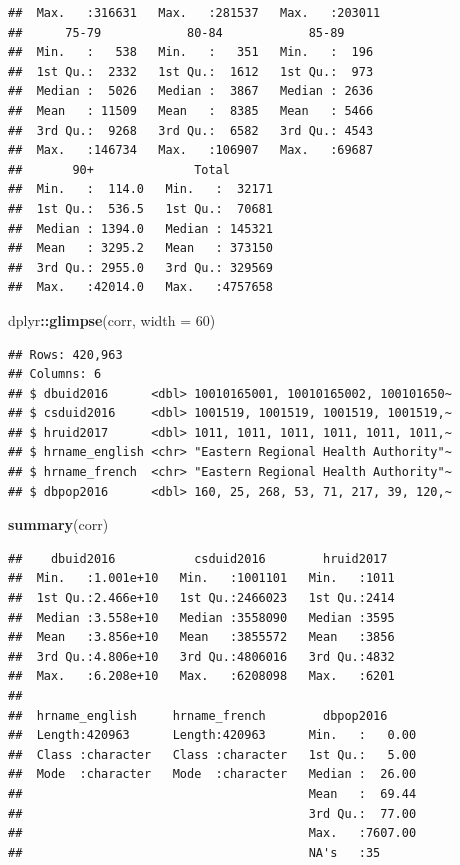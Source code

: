 \documentclass[
  11pt,
  oneside]{book}
\newenvironment{Shaded}{\begin{snugshade}}{\end{snugshade}}
\newcommand{\AttributeTok}[1]{\textcolor[rgb]{0.13,0.29,0.53}{#1}}
\newcommand{\DecValTok}[1]{\textcolor[rgb]{0.00,0.00,0.81}{#1}}
\newcommand{\FunctionTok}[1]{\textcolor[rgb]{0.13,0.29,0.53}{\textbf{#1}}}
\newcommand{\NormalTok}[1]{#1}
\newcommand{\SpecialCharTok}[1]{\textcolor[rgb]{0.81,0.36,0.00}{\textbf{#1}}}
\begin{document}
\begin{verbatim}
##  Max.   :316631   Max.   :281537   Max.   :203011  
##      75-79            80-84            85-89      
##  Min.   :   538   Min.   :   351   Min.   :  196  
##  1st Qu.:  2332   1st Qu.:  1612   1st Qu.:  973  
##  Median :  5026   Median :  3867   Median : 2636  
##  Mean   : 11509   Mean   :  8385   Mean   : 5466  
##  3rd Qu.:  9268   3rd Qu.:  6582   3rd Qu.: 4543  
##  Max.   :146734   Max.   :106907   Max.   :69687  
##       90+              Total        
##  Min.   :  114.0   Min.   :  32171  
##  1st Qu.:  536.5   1st Qu.:  70681  
##  Median : 1394.0   Median : 145321  
##  Mean   : 3295.2   Mean   : 373150  
##  3rd Qu.: 2955.0   3rd Qu.: 329569  
##  Max.   :42014.0   Max.   :4757658
\end{verbatim}

\begin{Shaded}
\begin{Highlighting}[]
\NormalTok{dplyr}\SpecialCharTok{::}\FunctionTok{glimpse}\NormalTok{(corr, }\AttributeTok{width =} \DecValTok{60}\NormalTok{)}
\end{Highlighting}
\end{Shaded}

\begin{verbatim}
## Rows: 420,963
## Columns: 6
## $ dbuid2016      <dbl> 10010165001, 10010165002, 100101650~
## $ csduid2016     <dbl> 1001519, 1001519, 1001519, 1001519,~
## $ hruid2017      <dbl> 1011, 1011, 1011, 1011, 1011, 1011,~
## $ hrname_english <chr> "Eastern Regional Health Authority"~
## $ hrname_french  <chr> "Eastern Regional Health Authority"~
## $ dbpop2016      <dbl> 160, 25, 268, 53, 71, 217, 39, 120,~
\end{verbatim}

\begin{Shaded}
\begin{Highlighting}[]
\FunctionTok{summary}\NormalTok{(corr)}
\end{Highlighting}
\end{Shaded}

\begin{verbatim}
##    dbuid2016           csduid2016        hruid2017   
##  Min.   :1.001e+10   Min.   :1001101   Min.   :1011  
##  1st Qu.:2.466e+10   1st Qu.:2466023   1st Qu.:2414  
##  Median :3.558e+10   Median :3558090   Median :3595  
##  Mean   :3.856e+10   Mean   :3855572   Mean   :3856  
##  3rd Qu.:4.806e+10   3rd Qu.:4806016   3rd Qu.:4832  
##  Max.   :6.208e+10   Max.   :6208098   Max.   :6201  
##                                                      
##  hrname_english     hrname_french        dbpop2016      
##  Length:420963      Length:420963      Min.   :   0.00  
##  Class :character   Class :character   1st Qu.:   5.00  
##  Mode  :character   Mode  :character   Median :  26.00  
##                                        Mean   :  69.44  
##                                        3rd Qu.:  77.00  
##                                        Max.   :7607.00  
##                                        NA's   :35
\end{verbatim}
\end{document}
